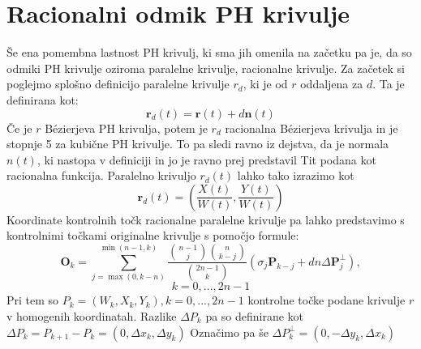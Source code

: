 \documentclass[12pt]{article}
\begin{document}
\section*{Racionalni odmik PH krivulje}
Še ena pomembna lastnost PH krivulj, ki sma jih omenila na začetku pa je, da so odmiki PH krivulje oziroma paralelne krivulje, racionalne krivulje. 
Za začetek si poglejmo splošno definicijo paralelne krivulje $r_d$, ki je od $r$ oddaljena za $d$. Ta je definirana kot:
$$\textbf{r}_d(t) = \textbf{r}(t) + d \textbf{n}(t)$$
Če je $r$ B\'ezierjeva PH krivulja, potem je $r_d$ racionalna B\'ezierjeva krivulja in je stopnje 5 za kubične PH krivulje. 
To pa sledi ravno iz dejstva, da je normala $n(t)$, ki nastopa v definiciji in jo je ravno prej predstavil Tit podana kot racionalna funkcija. 
Paralelno krivuljo $r_d(t)$ lahko tako izrazimo kot 
$$ \textbf{r}_d(t) = \left(\frac{X(t)}{W(t)}, \frac{Y(t)}{W(t)}\right)$$ 
Koordinate kontrolnih točk racionalne paralelne krivulje pa lahko predstavimo s kontrolnimi točkami originalne krivulje s pomočjo formule:
$$\textbf{O}_k = \sum_{j=\max(0, k-n)}^{\min(n-1, k)} \frac{\binom{n-1}{j} \binom{n}{k-j}}{\binom{2n-1}{k}}(\sigma_j \textbf{P}_{k-j}+ d n \Delta\textbf{P}^\perp_j),$$ 
$$k=0, ..., 2n-1$$
Pri tem so $P_k = (W_k, X_k, Y_k),    k = 0, ..., 2n-1$ kontrolne točke podane krivulje $r$ v homogenih koordinatah. 
Razlike $\Delta P_k$ pa so definirane kot $\Delta P_k = P_{k+1} - P_k = (0, \Delta x_k, \Delta y_k)$
Označimo pa še $\Delta P_k^{\perp} = (0, -\Delta y_k, \Delta x_k)$
\end{document}
